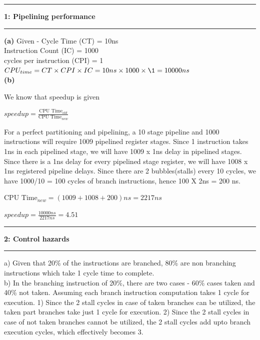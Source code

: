 \documentclass[11pt]{article}
\newcommand\question[2]{\vspace{.25in}\hrule\textbf{#1: #2}\vspace{.5em}\hrule\vspace{.10in}}
\renewcommand\part[1]{\vspace{.10in}\textbf{(#1)}}
\begin{document}
\raggedright
\newcommand\NAME{Vikas Kumar Rao}  %
\newcommand\UID{U1072596}     %
\newcommand\HWNUM{2}              %
\question{1}{Pipelining performance}
\part{a}
Given - 
Cycle Time (CT) = 10ns\\
Instruction Count (IC) = 1000\\
cycles per instruction (CPI) = 1\\

$CPU_{time} = CT \times CPI \times IC = 10ns \times 1000 \times \1 = 10000ns$\\

\part{b}

We know that speedup is given

$speedup = \frac{\text{CPU Time}_{old}}{\text{CPU Time}_{new}}$

For a perfect partitioning and pipelining, a 10 stage pipeline and 1000 instructions will require 1009 pipelined register stages. Since 1 instruction takes 1ns in each pipelined stage, we will have 1009 x 1ns delay in pipelined stages.
Since there is a 1ns delay for every pipelined stage register, we will have 1008 x 1ns registered pipeline delays. Since there are 2 bubbles(stalls) every 10 cycles, we have 1000/10 = 100 cycles of branch instructions, hence 100 X 2ns = 200 ns.

$\text{CPU Time}_{new} = (1009 + 1008 + 200)ns = 2217ns$

$speedup = \frac{10000ns}{2217ns} = 4.51$

\question{2}{Control hazards}

a) Given that 20\% of the instructions are branched, 80\% are non branching instructions which take 1 cycle time to complete.\\
b) In the branching instruction of 20\%, there are two cases - 60\% cases taken and 40\% not taken. Assuming each branch instruction computation takes 1 cycle for execution.
  1) Since the 2 stall cycles in case of taken branches can be utilized, the taken part branches take just 1 cycle for execution.
  2) Since the 2 stall cycles in case of not taken branches cannot be utilized, the 2 stall cycles add upto branch execution cycles, which effectively becomes 3.
\end{document}

